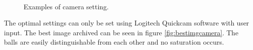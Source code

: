 \begin{figure}[H]
\centering
{}
\\

\caption{Examples of camera setting.}
\label{fig:wrongcamera}
\end{figure} 

The optimal settings can only be set using Logitech Quickcam software with user input. The best image archived can be seen in figure  \ref{fig:bestimgcamera}. The balls are easily distinguishable from each other and no saturation occurs.

